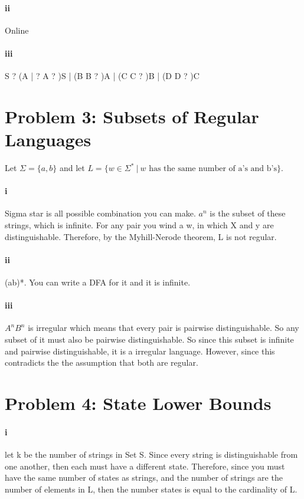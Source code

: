 \documentclass[10pt,letter]{article}
\begin{document}
\paragraph{ii}
Online

\paragraph{iii}
S ? (A | ?
A ? )S | (B
B ? )A | (C
C ? )B | (D
D ? )C

\section*{Problem 3: Subsets of Regular Languages}
Let $\Sigma = \{a, b\}$ and let $L = \{ w \in \Sigma^* \ | \ w \text{ has the same number of a's and b's} \}$. 
\paragraph{i} 

\proof Sigma star is all possible combination you can make. $a^n$ is the subset of these strings, which is infinite. For any pair you wind a w, in which  X and y are distinguishable. Therefore, by the Myhill-Nerode theorem, L is not regular. 

\paragraph{ii}
(ab)*. You can write a DFA for it and it is infinite. 

\paragraph{iii}
$A^nB^n$ is irregular which means that every pair is pairwise distinguishable. So any subset of it must also be pairwise distinguishable. So since this subset is infinite and pairwise distinguishable, it is a irregular language. However, since this contradicts the the assumption that both are regular. 

\section*{Problem 4: State Lower Bounds}
\paragraph{i}
let k be the number of strings in Set S. Since every string is distinguishable from one another, then each must have a different state. Therefore, since you must have the same number of states as strings, and the number of strings are the number of elements in L, then the number states is equal to the cardinality of L. 
\end{document}
